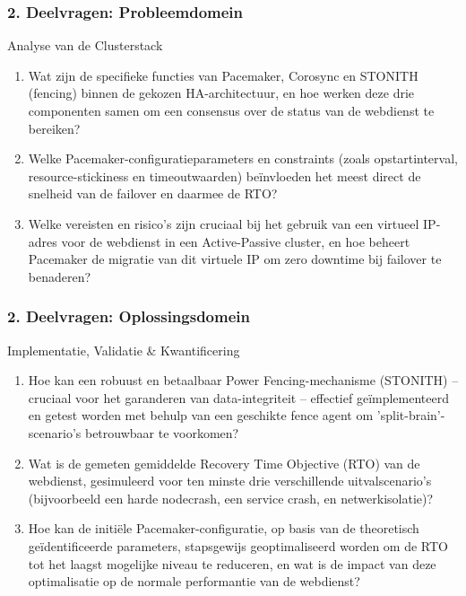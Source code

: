 \documentclass[aspectratio=169]{beamer}
\begin{document}
    \begin{frame}
        \frametitle{2. Deelvragen: Probleemdomein}
        \begin{block}{Analyse van de Clusterstack}
            \begin{enumerate}
                \item \small Wat zijn de specifieke functies van Pacemaker, Corosync en STONITH (fencing) binnen de gekozen HA-architectuur, en hoe werken deze drie componenten samen om een consensus over de status van de webdienst te bereiken?
                \item \small Welke Pacemaker-configuratieparameters en constraints (zoals opstartinterval, resource-stickiness en timeoutwaarden) beïnvloeden het meest direct de snelheid van de failover en daarmee de RTO?
                \item \small Welke vereisten en risico's zijn cruciaal bij het gebruik van een virtueel IP-adres voor de webdienst in een Active-Passive cluster, en hoe beheert Pacemaker de migratie van dit virtuele IP om zero downtime bij failover te benaderen?
            \end{enumerate}
        \end{block}
    \end{frame}
    
    \begin{frame}
        \frametitle{2. Deelvragen: Oplossingsdomein}
        \begin{block}{Implementatie, Validatie \& Kwantificering}
            \begin{enumerate}
                \item[4.] \small Hoe kan een robuust en betaalbaar Power Fencing-mechanisme (STONITH) -- cruciaal voor het garanderen van data-integriteit -- effectief geïmplementeerd en getest worden met behulp van een geschikte fence agent om 'split-brain'-scenario's betrouwbaar te voorkomen?
                \item[5.] \small Wat is de gemeten gemiddelde Recovery Time Objective (RTO) van de webdienst, gesimuleerd voor ten minste drie verschillende uitvalscenario's (bijvoorbeeld een harde nodecrash, een service crash, en netwerkisolatie)?
                \item[6.] \small Hoe kan de initiële Pacemaker-configuratie, op basis van de theoretisch geïdentificeerde parameters, stapsgewijs geoptimaliseerd worden om de RTO tot het laagst mogelijke niveau te reduceren, en wat is de impact van deze optimalisatie op de normale performantie van de webdienst?
            \end{enumerate}
        \end{block}
    \end{frame}
    
\end{document}

